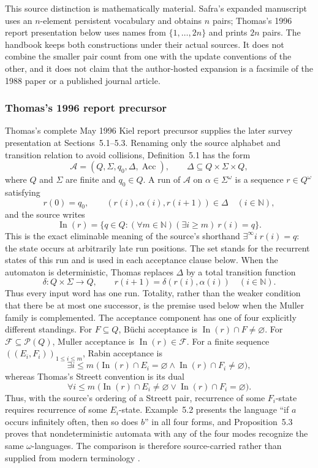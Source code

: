 This source distinction is mathematically material.  Safra's expanded
manuscript uses an \(n\)-element persistent vocabulary and obtains \(n\) pairs;
Thomas's 1996 report presentation below uses names from
\(\{1,\ldots,2n\}\) and prints \(2n\) pairs.  The handbook keeps both
constructions under their actual sources.  It does not combine the smaller
pair count from one with the update conventions of the other, and it does not
claim that the author-hosted expansion is a facsimile of the 1988 paper or a
published journal article.

\subsubsection{Thomas's 1996 report precursor}
Thomas's complete May 1996 Kiel report precursor supplies the later survey
presentation at Sections~5.1--5.3.  Renaming only the source alphabet and
transition relation to avoid collisions, Definition~5.1 has the form
\[
 \mathcal A=(Q,\Sigma,q_0,\Delta,\operatorname{Acc}),
 \qquad
 \Delta\subseteq Q\times\Sigma\times Q,
\]
where \(Q\) and \(\Sigma\) are finite and \(q_0\in Q\).  A run of \(\mathcal A\)
on \(\alpha\in\Sigma^\omega\) is a sequence \(r\in Q^\omega\) satisfying
\[
 r(0)=q_0,
 \qquad
 (r(i),\alpha(i),r(i+1))\in\Delta
 \quad(i\in\mathbb N),
\]
and the source writes
\[
 \operatorname{In}(r)
 =\{q\in Q:(\forall m\in\mathbb N)(\exists i\ge m)\ r(i)=q\}.
\]
This is the exact eliminable meaning of the source's shorthand
\(\exists^\infty i\;r(i)=q\): the state occurs at arbitrarily late run
positions.  The set stands for the recurrent states of this run and is used in
each acceptance clause below.
When the automaton is deterministic, Thomas replaces \(\Delta\) by a total
transition function
\[
 \delta:Q\times\Sigma\longrightarrow Q,
 \qquad
 r(i+1)=\delta(r(i),\alpha(i))
 \quad(i\in\mathbb N).
\]
Thus every input word has one run.  Totality, rather than the weaker condition
that there be at most one successor, is the premise used below when the Muller
family is complemented.
The acceptance component has one of four explicitly different standings.  For
\(F\subseteq Q\), B\"uchi acceptance is
\(\operatorname{In}(r)\cap F\neq\varnothing\).  For
\(\mathcal F\subseteq\mathcal P(Q)\), Muller acceptance is
\(\operatorname{In}(r)\in\mathcal F\).  For a finite sequence
\(((E_i,F_i))_{1\leq i\leq m}\), Rabin acceptance is
\[
 \exists i\leq m\;
 \bigl(\operatorname{In}(r)\cap E_i=\varnothing
       \land
       \operatorname{In}(r)\cap F_i\neq\varnothing\bigr),
\]
whereas Thomas's Streett convention is its dual
\[
 \forall i\leq m\;
 \bigl(\operatorname{In}(r)\cap E_i\neq\varnothing
       \lor
       \operatorname{In}(r)\cap F_i=\varnothing\bigr).
\]
Thus, with the source's ordering of a Streett pair, recurrence of some
\(F_i\)-state requires recurrence of some \(E_i\)-state.  Example~5.2 presents
the language ``if \(a\) occurs infinitely often, then so does \(b\)'' in all
four forms, and Proposition~5.3 proves that nondeterministic automata with any
of the four modes recognize the same \(\omega\)-languages.  The comparison is
therefore source-carried rather than supplied from modern terminology
\cite[\S5.1]{Thomas1996Report}.

